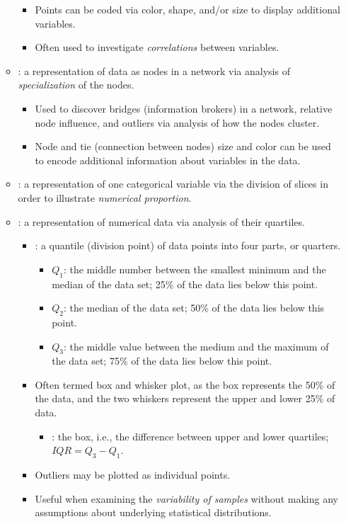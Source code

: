 \begin{itemize}
\begin{itemize}
      \begin{itemize}
        \item Points can be coded via color, shape, and/or size to display additional variables.
        \item Often used to investigate \emph{correlations} between variables.
      \end{itemize}
    \item {}: a representation of data as nodes in a network via analysis of \emph{specialization} of the nodes.
      \begin{itemize}
        \item Used to discover bridges (information brokers) in a network, relative node influence, and outliers via analysis of how the nodes cluster.
        \item Node and tie (connection between nodes) size and color can be used to encode additional information about variables in the data.
      \end{itemize}
    \item {}: a representation of one categorical variable via the division of slices in order to illustrate \emph{numerical proportion}.
    \item {}: a representation of numerical data via analysis of their quartiles.
      \begin{itemize}
        \item {}: a quantile (division point) of data points into four parts, or quarters. 
          \begin{itemize}
            \item \(Q_1\): the middle number between the smallest minimum and the median of the data set; 25\% of the data lies below this point.
            \item \(Q_2\): the median of the data set; 50\% of the data lies below this point.
            \item \(Q_3\): the middle value between the medium and the maximum of the data set; 75\% of the data lies below this point.
          \end{itemize}
        \item Often termed box and whisker plot, as the box represents the 50\% of the data, and the two whiskers represent the upper and lower 25\% of data.
          \begin{itemize}
            \item {}: the box, i.e., the difference between upper and lower quartiles; \(IQR = Q_3-Q_1\).
          \end{itemize}
        \item Outliers may be plotted as individual points.
        \item Useful when examining the \emph{variability of samples} without making any assumptions about underlying statistical distributions.
      \end{itemize}
  \end{itemize}
  
\end{itemize}

